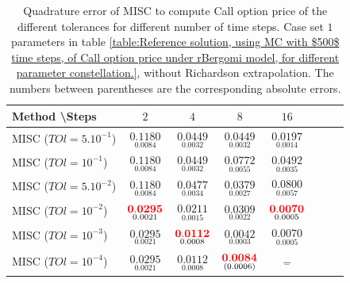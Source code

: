 \documentclass[11pt]{article}
\begin{document}
\begin{table}[h!]
	\centering
	\begin{tabular}{l*{6}{c}r}
		Method \textbackslash  Steps            & $2$ & $4$ & $8$ & $16$  \\
		\hline
		MISC ($TOl=5.10^{-1}$)  & $\underset{0.0084}{\mathbf{  0.1180}}$ & $\underset{0.0032
		}{\mathbf{0.0449
		}}$ & $\underset{0.0032}{\mathbf{0.0449}}$ & $\underset{0.0014}{\mathbf{0.0197}}$  \\
		MISC ($TOl=10^{-1}$)  & $\underset{0.0084}{\mathbf{  0.1180}}$ & $\underset{0.0032
		}{\mathbf{0.0449
		}}$ & $\underset{0.0055}{\mathbf{0.0772}}$ & $\underset{0.0035
		}{\mathbf{0.0492}}$  \\
		MISC ($TOl=5.10^{-2}$)  &$\underset{0.0084}{\mathbf{  0.1180}}$ & $\underset{0.0034}{\mathbf{0.0477}}$ & $\underset{0.0027}{\mathbf{0.0379
		}}$ & $\underset{0.0057}{\mathbf{0.0800}}$  \\
		MISC ($TOl=10^{-2}$)  & $\underset{ 0.0021
		}{\mathbf{{\color{red}0.0295}}}$ & $\underset{0.0015}{\mathbf{0.0211}}$ & $\underset{0.0022
		}{\mathbf{0.0309
		}}$ & $\underset{0.0005}{\mathbf{{\color{red}0.0070}}}$  \\
		MISC ($TOl=10^{-3}$)  & $\underset{ 0.0021
		}{\mathbf{0.0295}}$ & $\underset{0.0008}{\mathbf{ {\color{red}0.0112}}}$ & $\underset{0.0003
		}{\mathbf{0.0042
		}}$ & $\underset{0.0005}{\mathbf{ 0.0070}}$  \\
		MISC ($TOl=10^{-4}$)  & $\underset{ 0.0021
		}{\mathbf{0.0295}}$ & $\underset{0.0008}{\mathbf{ 0.0112}}$ & $\underset{(0.0006)
		}{\mathbf{{\color{red}0.0084}
		}}$ & $\underset{-}{\mathbf{-}}$  \\
		\hline
	\end{tabular}
	\caption{Quadrature error of MISC to compute Call option price of the different tolerances for different number of time steps. Case  set $1$ parameters in table \ref{table:Reference solution, using MC with $500$ time steps, of Call option price under rBergomi model, for different parameter constellation.}, without Richardson extrapolation. The numbers between parentheses are the corresponding absolute errors.}
	\label{Quadrature error of MISC to compute Call option price of the different tolerances for different number of time steps. Case  set $1$ parameters, without Richardson extrapolation. The numbers between parentheses are the corresponding absolute errors.}
\end{table}
\end{document}
